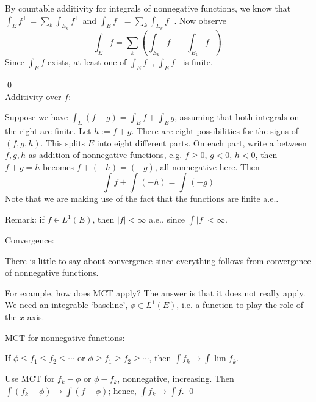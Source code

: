 \pf By countable additivity for integrals of nonnegative functions, we know that $\int_E f^+= \sum_k \int_{E_k} f^+$ and $\int_E f^-= \sum_k \int_{E_k} f^-$. Now observe
	\[
	\int_E f = \sum_k \left( \int_{E_k} f^+ - \int_{E_k} f^- \right).
	\]
Since $\int_E f$ exists, at least one of $\int_E f^+$, $\int_E f^-$ is finite. 


\qed \\




Additivity over $f$:

Suppose we have $\int_E (f+g)= \int_E f + \int_E g$, assuming that both integrals on the right are finite. Let $h:= f+g$. There are eight possibilities for the signs of $(f,g,h)$. This splits $E$ into eight different parts. On each part, write a between $f,g,h$ as addition of nonnegative functions, e.g. $f \geq 0$, $g<0$, $h<0$, then $f+g=h$ becomes $f+(-h)=(-g)$, all nonnegative here. Then
	\[
	\int f + \int (-h) = \int (-g)
	\]
Note that we are making use of the fact that the functions are finite a.e.. 



Remark: if $f \in L^1(E)$, then $|f|<\infty$ a.e., since $\int |f|<\infty$. 




Convergence: 

There is little to say about convergence since everything follows from convergence of nonnegative functions. 


For example, how does MCT apply? The answer is that it does not really apply. We need an integrable `baseline', $\phi \in L^1(E)$, i.e. a function to play the role of the $x$-axis. 

MCT for nonnegative functions: 


If $\phi \leq f_1 \leq f_2 \leq \cdots$ or $\phi \geq f_1 \geq f_2 \geq \cdots$, then $\int f_k \to \int \lim f_k$. 

\pf Use MCT for $f_k - \phi$ or $\phi - f_k$, nonnegative, increasing. Then $\int (f_k - \phi) \to \int (f-\phi)$; hence, $\int f_k \to \int f$. \qed \\



